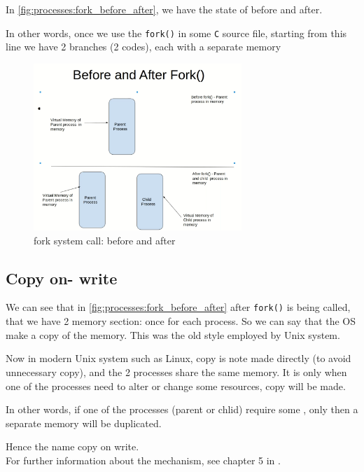 \documentclass[12pt,a4paper]{book}
\begin{document}
In \autoref{fig:processes:fork_before_after}, we have the state of before and after. 

In other words, once we use the \verb|fork()| in some \verb|C| source file, starting from this line we have 2 branches (2 codes), each with a separate memory

\begin{figure}[h]
\centering
\includegraphics[width = 0.7\textwidth, frame]{Figures/processes/fork_before_after}
\caption{fork system call: before and after}
\label{fig:processes:fork_before_after}
\end{figure}

\subsection{Copy on- write}

We can see that in \autoref{fig:processes:fork_before_after} after \verb|fork()| is being called, that we have 2 memory section: once for each process. So we can say that the OS make a copy of the memory. This was the old style employed by Unix system.

Now in modern Unix system such as Linux, copy is note made  directly (to avoid unnecessary copy), and the 2 processes share the same memory. It is only when one of the processes need to alter or change some resources, copy will be made.

In other words, if one of the processes (parent or chlid) require some , only then a separate memory will be duplicated.

Hence the name copy on write.\\

For further information about the mechanism, see chapter 5 in \cite{book_Linux_System_Programming_Robert_Love}.
\end{document}
